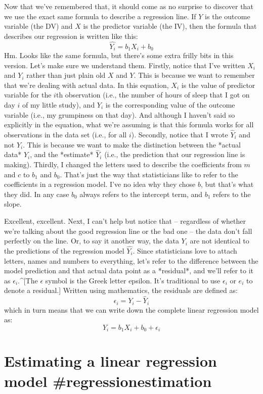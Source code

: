 Now that we've remembered that, it should come as no surprise to discover that we use the exact same formula to describe a regression line. If $Y$ is the outcome variable (the DV) and $X$ is the predictor variable (the IV), then the formula that describes our regression is written like this:
$$
\hat{Y_i} = b_1 X_i + b_0
$$
Hm. Looks like the same formula, but there's some extra frilly bits in this version. Let's make sure we understand them. Firstly, notice that I've written $X_i$ and $Y_i$ rather than just plain old $X$ and $Y$. This is because we want to remember that we're dealing with actual data. In this equation, $X_i$ is the value of predictor variable for the $i$th observation (i.e., the number of hours of sleep that I got on day $i$ of my little study), and $Y_i$ is the corresponding value of the outcome variable (i.e., my grumpiness on that day). And although I haven't said so explicitly in the equation, what we're assuming is that this formula works for all observations in the data set (i.e., for all $i$). Secondly, notice that I wrote $\hat{Y}_i$ and not $Y_i$. This is because we want to make the distinction between the *actual data* $Y_i$, and the *estimate* $\hat{Y}_i$ (i.e., the prediction that our regression line is making). Thirdly, I changed the letters used to describe the coefficients from $m$ and $c$ to $b_1$ and $b_0$. That's just the way that statisticians like to refer to the coefficients in a regression model. I've no idea why they chose $b$, but that's what they did. In any case $b_0$ always refers to the intercept term, and $b_1$ refers to the slope.

Excellent, excellent. Next, I can't help but notice that -- regardless of whether we're talking about the good regression line or the bad one -- the data don't fall perfectly on the line. Or, to say it another way, the data $Y_i$ are not identical to the predictions of the regression model $\hat{Y_i}$. Since statisticians love to attach letters, names and numbers to everything, let's refer to the difference between the model prediction and that actual data point as a *residual*, and we'll refer to it as $\epsilon_i$.^[The $\epsilon$ symbol is the Greek letter epsilon. It's traditional to use $\epsilon_i$ or $e_i$ to denote a residual.] Written using mathematics, the residuals are defined as:
$$
\epsilon_i = Y_i - \hat{Y}_i
$$
which in turn means that we can write down the complete linear regression model as:
$$
Y_i = b_1 X_i + b_0 + \epsilon_i
$$


\section{Estimating a linear regression model {#regressionestimation}}


